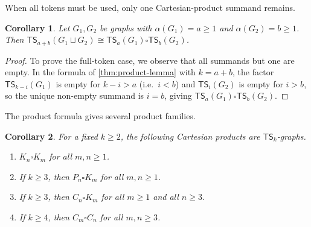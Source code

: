 \documentclass[a4paper]{article}
\theoremstyle{plain}
\newtheorem{corollary}[corollary]{Corollary}
\theoremstyle{definition}
\newcommand{\TSsym}{\mathsf{TS}}
\numberwithin{equation}{section}
\begin{document}
When all tokens must be used, only one Cartesian-product summand remains.

\begin{corollary}
\label{cor:product-saturation}
Let $G_1,G_2$ be graphs with $\alpha(G_1)=a\ge 1$ and $\alpha(G_2)=b\ge 1$.
Then $\TSsym_{a+b}(G_1\sqcup G_2)\cong \TSsym_a(G_1)\square \TSsym_b(G_2)$.
\end{corollary}

\begin{proof}
To prove the full-token case, we observe that all summands but one are empty.
In the formula of \cref{thm:product-lemma} with $k=a+b$, the factor $\TSsym_{k-i}(G_1)$ is empty for $k-i>a$ (i.e.\ $i<b$) and $\TSsym_i(G_2)$ is empty for $i>b$, so the unique non-empty summand is $i=b$, giving $\TSsym_a(G_1)\square \TSsym_b(G_2)$.
\end{proof}

The product formula gives several product families.

\begin{corollary}
\label{cor:product-families}
For a fixed $k\ge 2$, the following Cartesian products are $\TSsym_k$-graphs.
\begin{enumerate}[label=\textup{(\alph*)}]
\item $K_n\square K_m$ for all $m,n\ge 1$.
\item If $k\ge 3$, then $P_n\square K_m$ for all $m,n\ge 1$.
\item If $k\ge 3$, then $C_n\square K_m$ for all $m\ge 1$ and all $n\ge 3$.
\item If $k\ge 4$, then $C_m\square C_n$ for all $m,n\ge 3$.
\end{enumerate}
\end{corollary}
\end{document}
